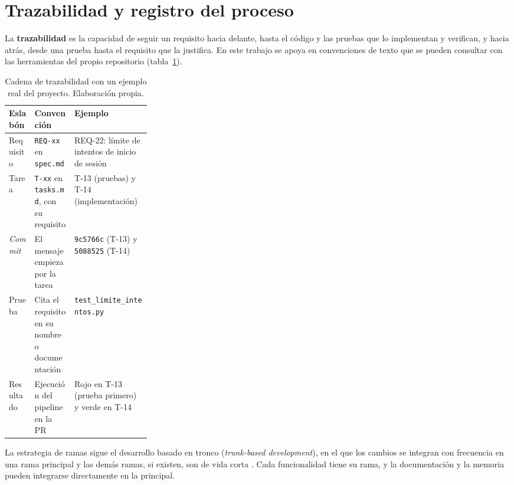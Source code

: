 \section{Trazabilidad y registro del proceso}\label{sec:Trazabilidad}

La \textbf{trazabilidad} es la capacidad de seguir un requisito hacia delante, hasta el código y las pruebas que lo implementan y verifican, y hacia atrás, desde una prueba hasta el requisito que la justifica. En este trabajo se apoya en convenciones de texto que se pueden consultar con las herramientas del propio repositorio (tabla~\ref{tab:Trazabilidad}). 

\begin{table}[htbp]
	\centering
	\small
	\caption{Cadena de trazabilidad con un ejemplo real del proyecto. Elaboración propia.}
	\label{tab:Trazabilidad}
	\begin{tabularx}{\linewidth}{@{}l>{\raggedright\arraybackslash}p{0.28\linewidth}>{\raggedright\arraybackslash}X@{}}
		\toprule
		\textbf{Eslabón} & \textbf{Convención} & \textbf{Ejemplo} \\
		\midrule
		Requisito & \texttt{REQ-xx} en \texttt{spec.md} & REQ-22: límite de intentos de inicio de sesión \\
		Tarea & \texttt{T-xx} en \texttt{tasks.md}, con su requisito & T-13 (pruebas) y T-14 (implementación) \\
		\emph{Commit} & El mensaje empieza por la tarea & \texttt{9c5766c} (T-13) y \texttt{5088525} (T-14) \\
		Prueba & Cita el requisito en su nombre o documentación & \texttt{test\_limite\_intentos.py} \\
		Resultado & Ejecución del pipeline en la PR & Rojo en T-13 (prueba primero) y verde en T-14 \\
		\bottomrule
	\end{tabularx}
\end{table}

La estrategia de ramas sigue el desarrollo basado en tronco (\emph{trunk-based development}), en el que los cambios se integran con frecuencia en una rama principal y las demás ramas, si existen, son de vida corta \citep{hammant2026tbd}. Cada funcionalidad tiene su rama, y la documentación y la memoria pueden integrarse directamente en la principal.

